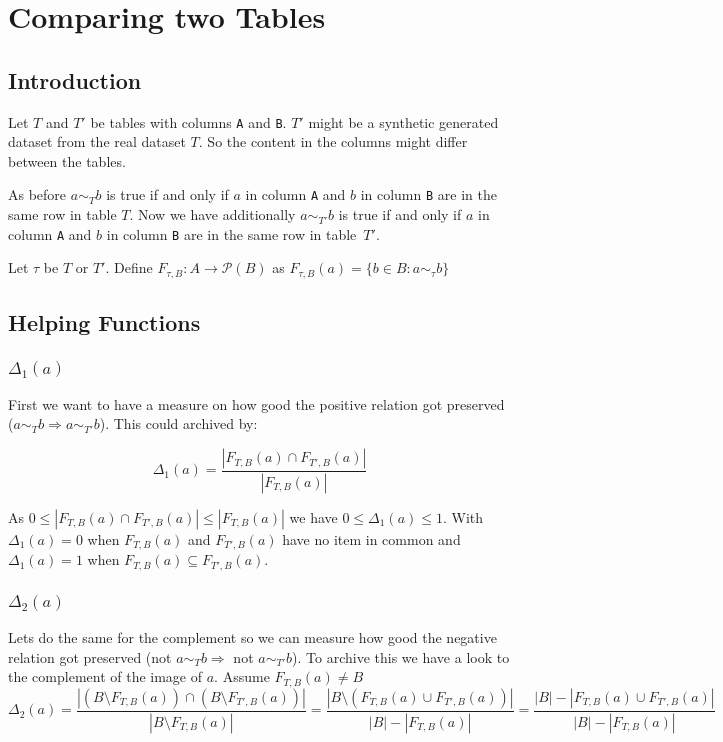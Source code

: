 \section{Comparing two Tables}
\subsection{Introduction}

Let $T$ and $T'$ be tables with columns \texttt{A} and \texttt{B}.
$T'$ might be a synthetic generated dataset from the real dataset $T$.
So the content in the columns might differ between the tables.

As before $a \sim_T b$ is true if and only if $a$ in column \texttt{A} and $b$ in column \texttt{B} are in the same row in table $T$.
Now we have additionally $a \sim_{T'} b$ is true if and only if $a$ in column \texttt{A} and $b$ in column \texttt{B} are in the same row in table~$T'$.

Let $\tau$ be $T$ or $T'$. Define $F_{\tau, B} : A \to \mathcal{P}(B)$ as $F_{\tau, B}(a) = \{ b \in B : a \sim_\tau b \}$

\subsection{Helping Functions}
\subsubsection{$\Delta_1(a)$}
First we want to have a measure on how good the positive relation got preserved ($a \sim_T b \Rightarrow a \sim_{T'} b$).
This could archived by:

\[
  \Delta_1(a) = 
    \frac{\left|F_{T, B}(a) \cap F_{T', B}(a)\right|}{|F_{T, B}(a)|}
\]

As $0 \leq \left|F_{T, B}(a) \cap F_{T', B}(a)\right| \leq |F_{T, B}(a)|$ we have $0 \leq \Delta_1(a) \leq 1$.
With $\Delta_1(a) = 0$ when $F_{T, B}(a)$ and $F_{T', B}(a)$ have no item in common
and $\Delta_1(a) = 1$ when $F_{T, B}(a) \subseteq F_{T', B}(a)$.


\subsubsection{$\Delta_2(a)$}
Lets do the same for the complement so we can measure how good the negative relation got preserved (not $a \sim_T b \Rightarrow$ not $a \sim_{T'} b$).
To archive this we have a look to the complement of the image of $a$.
Assume $F_{T, B}(a) \neq B$
\[
  \Delta_2(a) = 
    \frac{\left|\left(B \setminus F_{T, B}(a)\right) \cap \left(B \setminus F_{T', B}(a)\right)\right|}{|B \setminus F_{T, B}(a)|}
    = \frac{\left|B \setminus \left(F_{T, B}(a) \cup F_{T', B}(a)\right)\right|}{|B| - |F_{T, B}(a)|}
    = \frac{|B| - \left|F_{T, B}(a) \cup F_{T', B}(a)\right|}{|B| - |F_{T, B}(a)|}
\]

